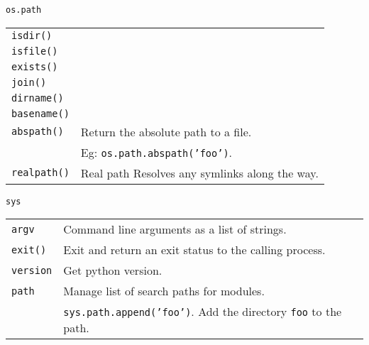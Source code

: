\begin{center}
    \large{\texttt{os.path}}\\
\end{center}

\begin{tabularx}{\linewidth}{lX}
    \texttt{isdir()}         & \\
    \texttt{isfile()}        & \\
    \texttt{exists()}        & \\
    \hline
    \texttt{join()}          & \\
    \texttt{dirname()}       & \\
    \texttt{basename()}      & \\
    \hline
    \texttt{abspath()}       & Return the absolute path to a file.\\
                             & Eg: \texttt{os.path.abspath('foo')}.\\
    \texttt{realpath()}      & Real path Resolves any symlinks along the way.\\
    \hline
\end{tabularx}

\begin{center}
    \large{\texttt{sys}}\\
\end{center}


\begin{tabularx}{\linewidth}{lX}
    \texttt{argv}           & Command line arguments as a list of strings.\\ 
    \texttt{exit()}         & Exit and return an exit status to the calling process.\\
    \texttt{version}        & Get python version.\\
    \texttt{path}           & Manage list of search paths for modules.\\ 
                            & \texttt{sys.path.append('foo')}. Add the  directory \texttt{foo} to the path.\\
    \hline
\end{tabularx}

